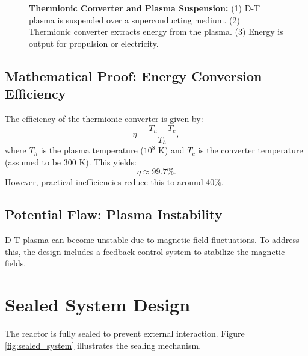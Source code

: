 \documentclass[12pt, a4paper]{article}
\begin{document}
\begin{figure}[H]
\centering
{}
\caption{
\textbf{Thermionic Converter and Plasma Suspension:} 
(1) D-T plasma is suspended over a superconducting medium. 
(2) Thermionic converter extracts energy from the plasma. 
(3) Energy is output for propulsion or electricity.
}
\label{fig:thermionic_converter}
\end{figure}

\subsection{Mathematical Proof: Energy Conversion Efficiency}
The efficiency of the thermionic converter is given by:
\[
\eta = \frac{T_h - T_c}{T_h},
\]
where \( T_h \) is the plasma temperature ($10^8$ K) and \( T_c \) is the converter temperature (assumed to be 300 K). This yields:
\[
\eta \approx 99.7\%.
\]
However, practical inefficiencies reduce this to around 40\%.

\subsection{Potential Flaw: Plasma Instability}
D-T plasma can become unstable due to magnetic field fluctuations. To address this, the design includes a feedback control system to stabilize the magnetic fields.

\section{Sealed System Design}
The reactor is fully sealed to prevent external interaction. Figure \ref{fig:sealed_system} illustrates the sealing mechanism.
\end{document}
